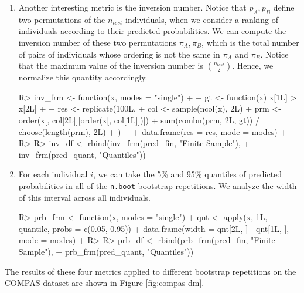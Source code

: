 \documentclass[
  nojss]{jss}
\begin{document}
\begin{enumerate}
\item Another interesting metric is the inversion number. Notice that $p_A, p_B$ define two permutations of the $n_{test}$ individuals, when we consider a ranking of individuals according to their predicted probabilities. We can compute the inversion number of these two permutations $\pi_A, \pi_B$, which is the total number of pairs of individuals whose ordering is not the same in $\pi_A$ and $\pi_B$. Notice that the maximum value of the inversion number is $\binom{n_{test}}{2}$. Hence, we normalize this quantity accordingly.

\begin{CodeChunk}
\begin{CodeInput}
R> inv_frm <- function(x, modes = "single") {
+ 
+   gt <- function(x) x[1L] > x[2L]
+ 
+   res <- replicate(100L, {
+     col <- sample(ncol(x), 2L)
+     prm <- order(x[, col[2L]][order(x[, col[1L]])])
+     sum(combn(prm, 2L, gt)) / choose(length(prm), 2L)
+   })
+ 
+   data.frame(res = res, mode = modes)
+ }
R> 
R> inv_df <- rbind(inv_frm(pred_fin, "Finite Sample"),
+                 inv_frm(pred_quant, "Quantiles"))
\end{CodeInput}
\end{CodeChunk}

\item For each individual $i$, we can take the 5\% and 95\% quantiles of predicted probabilities in all of the \texttt{n.boot} bootstrap repetitions. We analyze the width of this interval across all individuals.

\begin{CodeChunk}
\begin{CodeInput}
R> prb_frm <- function(x, modes = "single") {
+   qnt <- apply(x, 1L, quantile, probs = c(0.05, 0.95))
+   data.frame(width = qnt[2L, ] - qnt[1L, ], mode = modes)
+ }
R> 
R> prb_df <- rbind(prb_frm(pred_fin, "Finite Sample"),
+                 prb_frm(pred_quant, "Quantiles"))
\end{CodeInput}
\end{CodeChunk}

\end{enumerate}

The results of these four metrics applied to different bootstrap
repetitions on the COMPAS dataset are shown in Figure
\ref{fig:compas-dm}.
\end{document}
